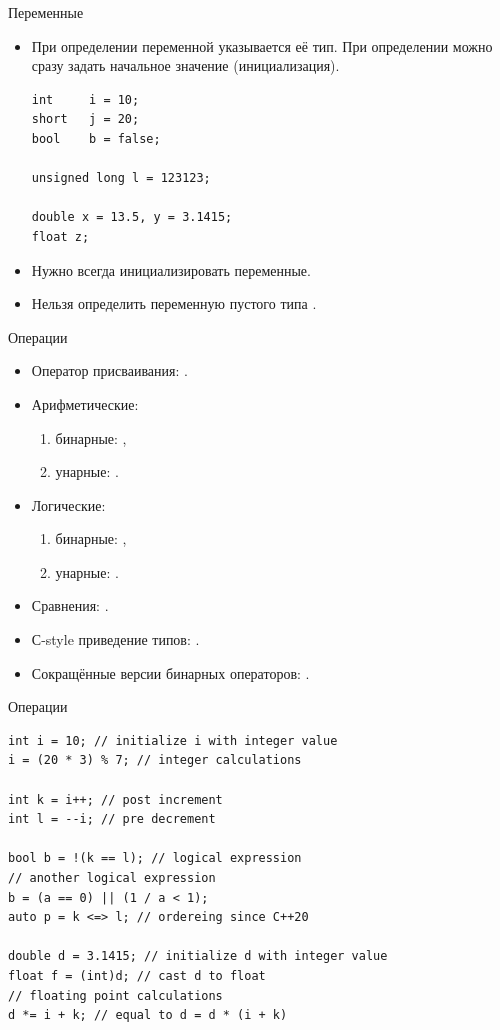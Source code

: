 \documentclass[aspectration=1610,t]{beamer}
\begin{document}
\begin{frame}[fragile]{Переменные}
\begin{itemize}
    \item При определении переменной указывается её тип. При определении можно
        сразу задать начальное значение (инициализация).
        \begin{lstlisting}
int     i = 10;
short   j = 20;
bool    b = false;

unsigned long l = 123123;

double x = 13.5, y = 3.1415;
float z;
        \end{lstlisting}
    \item Нужно всегда инициализировать переменные.
    \item Нельзя определить переменную пустого типа .
\end{itemize}
\end{frame}

\begin{frame}[fragile]{Операции}
    \begin{itemize}
        \item Оператор присваивания: \code{=}.
        \item Арифметические:
        \begin{enumerate}
            \item бинарные: \code{+ - * / \%},
            \item унарные:  \code{++ {-}{-}}.
        \end{enumerate}
        \item Логические:
        \begin{enumerate}
            \item бинарные:  \code{\&\& ||},
            \item унарные:   \code{!}. 
        \end{enumerate}
        \item Сравнения: \code{== != > < >= <= <=>}.
        \item С-style приведение типов: .
        \item Сокращённые версии бинарных операторов:
            \code{+= -= *= /= \%=}.
    \end{itemize}
\end{frame}

\begin{frame}[fragile]{Операции}
    \begin{lstlisting}
int i = 10; // initialize i with integer value
i = (20 * 3) % 7; // integer calculations

int k = i++; // post increment
int l = --i; // pre decrement

bool b = !(k == l); // logical expression
// another logical expression
b = (a == 0) || (1 / a < 1);
auto p = k <=> l; // ordereing since C++20

double d = 3.1415; // initialize d with integer value
float f = (int)d; // cast d to float
// floating point calculations
d *= i + k; // equal to d = d * (i + k)
    \end{lstlisting}
\end{frame}
\end{document}
